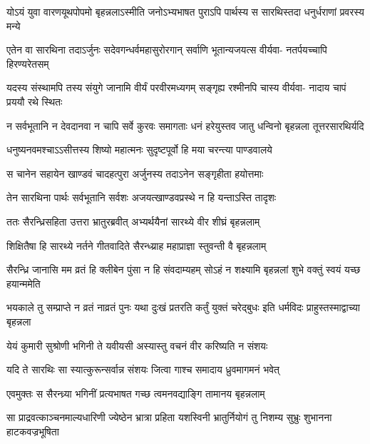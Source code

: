 \fourlineindentedshloka
{योऽयं युवा वारणयूथपोपमो}
{बृहन्नलाऽस्मीति जनोऽभ्यभाषत}
{पुराऽपि पार्थस्य स सारथिस्तदा}
{धनुर्धराणां प्रवरस्य मन्ये}


\fourlineindentedshloka
{एतेन वा सारथिना तदाऽर्जुनः}
{सदेवगन्धर्वमहासुरोरगान्}
{सर्वाणि भूतान्यजयत्स वीर्यवा-}
{नतर्पयच्चापि हिरण्यरेतसम्}


\fourlineindentedshloka
{यदस्य संस्थामपि तस्य संयुगे}
{जानामि वीर्यं परवीरमध्यगम्}
{सङ्गृह्य रश्मीनपि चास्य वीर्यवा-}
{नादाय चापं प्रययौ रथे स्थितः}


\fourlineindentedshloka
{न सर्वभूतानि न देवदानवा}
{न चापि सर्वे कुरवः समागताः}
{धनं हरेयुस्तव जातु धन्विनो}
{बृहन्नला तूत्तरसारथिर्यदि}


\twolineshloka
{धनुष्यनवमश्चाऽऽसीत्तस्य शिष्यो महात्मनः}
{सुदृष्टपूर्वो हि मया चरन्त्या पाण्डवालये}


\twolineshloka
{स चानेन सहायेन खाण्डवं चादहत्पुरा}
{अर्जुनस्य तदाऽनेन सङ्गृहीता हयोत्तमाः}


\twolineshloka
{तेन सारथिना पार्थः सर्वभूतानि सर्वशः}
{अजयत्खाण्डवप्रस्थे न हि यन्ताऽस्ति तादृशः}



\twolineshloka
{ततः सैरन्ध्रिसहिता उत्तरा भ्रातुरब्रवीत्}
{अभ्यर्थयैनां सारथ्ये वीर शीघ्रं बृहन्नलाम्}


\twolineshloka
{शिक्षितैषा हि सारथ्ये नर्तने गीतवादिते}
{सैरन्ध्य्राह महाप्राज्ञा स्तुवन्ती वै बृहन्नलाम्}




\fourlineindentedshloka
{सैरन्ध्रि जानासि मम व्रतं हि}
{क्लीबेन पुंसा न हि संवदाम्यहम्}
{सोऽहं न शक्ष्यामि बृहन्नलां शुभे}
{वक्तुं स्वयं यच्छ हयान्ममेति}




\threelineshloka
{भयकाले तु सम्प्राप्ते न व्रतं नाव्रतं पुनः}
{यथा दुःखं प्रतरति कर्तुं युक्तं चरेद्बुधः}
{इति धर्मविदः प्राहुस्तस्माद्वाच्या बृहन्नला}


\twolineshloka
{येयं कुमारी सुश्रोणी भगिनी ते यवीयसी}
{अस्यास्तु वचनं वीर करिष्यति न संशयः}


\twolineshloka
{यदि ते सारथिः सा स्यात्कुरून्सर्वान्न संशयः}
{जित्वा गाश्च समादाय ध्रुवमागमनं भवेत्}



\twolineshloka
{एवमुक्तः स सैरन्ध्र्या भगिनीं प्रत्यभाषत}
{गच्छ त्वमनवद्याङ्गि तामानय बृहन्नलाम्}


\fourlineindentedshloka
{सा प्राद्रवत्काञ्चनमाल्यधारिणी}
{ज्येष्ठेन भ्रात्रा प्रहिता यशस्विनी}
{भ्रातुर्नियोगं तु निशम्य सुभ्रुः}
{शुभानना हाटकवज्रभूषिता}


